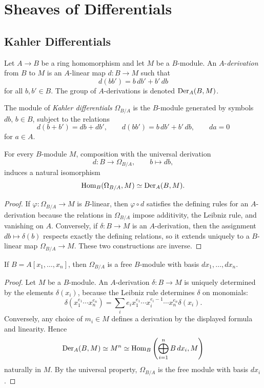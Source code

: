 \chapter{Sheaves of Differentials}

\section{Kahler Differentials}

\begin{definition}
Let \(A\to B\) be a ring homomorphism and let \(M\) be a \(B\)-module.  An
\(A\)-\emph{derivation} from \(B\) to \(M\) is an \(A\)-linear map
\(d:B\to M\) such that
\[
    d(bb')=b\,d b'+b'\,d b
\]
for all \(b,b'\in B\).  The group of \(A\)-derivations is denoted
\(\operatorname{Der}_A(B,M)\).
\end{definition}

\begin{definition}
The module of \emph{Kahler differentials} \(\Omega_{B/A}\) is the \(B\)-module
generated by symbols \(db\), \(b\in B\), subject to the relations
\[
    d(b+b')=db+db',\qquad d(bb')=b\,db'+b'\,db,\qquad da=0
\]
for \(a\in A\).
\end{definition}

\begin{proposition}
For every \(B\)-module \(M\), composition with the universal derivation
\[
    d:B\longrightarrow \Omega_{B/A},\qquad b\longmapsto db,
\]
induces a natural isomorphism
\[
    \operatorname{Hom}_B(\Omega_{B/A},M)\simeq \operatorname{Der}_A(B,M).
\]
\end{proposition}

\begin{proof}
If \(\varphi:\Omega_{B/A}\to M\) is \(B\)-linear, then
\(\varphi\circ d\) satisfies the defining rules for an \(A\)-derivation because
the relations in \(\Omega_{B/A}\) impose additivity, the Leibniz rule, and
vanishing on \(A\).  Conversely, if \(\delta:B\to M\) is an \(A\)-derivation,
then the assignment \(db\mapsto\delta(b)\) respects exactly the defining
relations, so it extends uniquely to a \(B\)-linear map
\(\Omega_{B/A}\to M\).  These two constructions are inverse.
\end{proof}

\begin{proposition}
If \(B=A[x_1,\ldots,x_n]\), then \(\Omega_{B/A}\) is a free \(B\)-module with
basis \(dx_1,\ldots,dx_n\).
\end{proposition}

\begin{proof}
Let \(M\) be a \(B\)-module.  An \(A\)-derivation \(\delta:B\to M\) is uniquely
determined by the elements \(\delta(x_i)\), because the Leibniz rule determines
\(\delta\) on monomials:
\[
    \delta(x_1^{e_1}\cdots x_n^{e_n})
    =
    \sum_i e_i x_1^{e_1}\cdots x_i^{e_i-1}\cdots x_n^{e_n}\delta(x_i).
\]
Conversely, any choice of \(m_i\in M\) defines a derivation by the displayed
formula and linearity.  Hence
\[
    \operatorname{Der}_A(B,M)\simeq M^n\simeq
    \operatorname{Hom}_B\left(\bigoplus_{i=1}^n B\,dx_i,M\right)
\]
naturally in \(M\).  By the universal property, \(\Omega_{B/A}\) is the free
module with basis \(dx_i\).
\end{proof}

